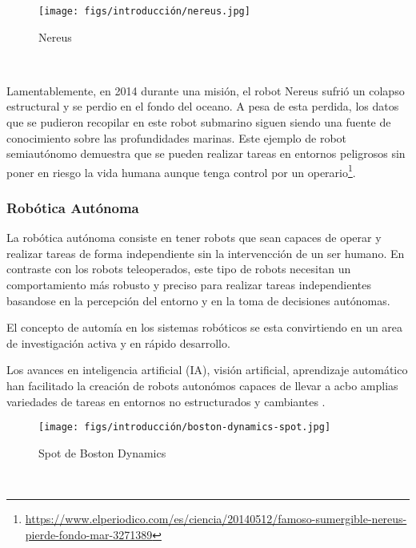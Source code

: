 \begin{figure} [H]
  \begin{center}
    \texttt{[image: figs/introducción/nereus.jpg]}
  \end{center}
  \caption{Nereus}
  \label{fig:Nereus}
\end{figure}\

Lamentablemente, en 2014 durante una misión, el robot Nereus sufrió un colapso estructural y se perdio en el fondo del oceano. A pesa de esta perdida, los datos que se pudieron
recopilar en este robot submarino siguen siendo una fuente de conocimiento sobre las profundidades marinas. Este ejemplo de robot semiautónomo demuestra que se pueden realizar 
tareas en entornos peligrosos sin poner en riesgo la vida humana aunque tenga control por un operario\footnote{\url{https://www.elperiodico.com/es/ciencia/20140512/famoso-sumergible-nereus-pierde-fondo-mar-3271389}}. 

\newpage
\subsubsection{Robótica Autónoma}
\label{sec:subseccion}

La robótica autónoma consiste en tener robots que sean capaces de operar y realizar tareas de forma independiente sin la intervencción de un ser humano. En contraste con los 
robots teleoperados, este tipo de robots necesitan un comportamiento más robusto y preciso para realizar tareas independientes basandose en la percepción del entorno 
y en la toma de decisiones autónomas. \newline

El concepto de automía en los sistemas robóticos se esta convirtiendo en un area de investigación activa y en rápido desarrollo. 


Los avances en inteligencia artificial (IA), visión 
artificial, aprendizaje automático han facilitado la creación de robots autonómos capaces de llevar a acbo amplias variedades de tareas en entornos no estructurados y cambiantes \cite{upm70576}. \newline 

\begin{figure} [H]
  \begin{center}
    \texttt{[image: figs/introducción/boston-dynamics-spot.jpg]}
  \end{center}
  \caption{Spot de Boston Dynamics}
  \label{fig:Boston Dynamics}
\end{figure}\
\newpage
